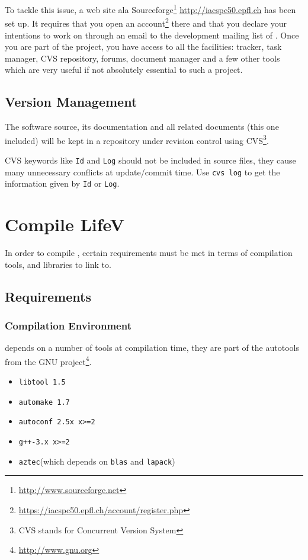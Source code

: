 To tackle this issue, a web site ala Sourceforge\footnote{\url{http://www.sourceforge.net}} \url{http://iacspc50.epfl.ch} has been set up. It requires that you open an account\footnote{\url{https://iacspc50.epfl.ch/account/register.php}} there and that you declare your intentions to work on \lifev through an email to the development mailing list of \lifev. Once you are part of the project, you have access to all the facilities: tracker, task manager, CVS repository, forums, document manager and a few other tools which are very useful if not absolutely essential to such a project.


\subsection{Version Management}
\label{sec:some-conventions}

The software source, its documentation and all related documents (this
one included) will be kept in a repository under revision control
using CVS\footnote{CVS
  stands for Concurrent Version System}.

CVS keywords like \verb!Id! and \verb!Log! should not be included in source files,
they cause many unnecessary conflicts at update/commit time. Use 
\verb!cvs log! to get the information given by \verb!Id! or \verb!Log!.

\section{Compile LifeV}
\label{compile-lifev} 

In order to compile \lifev, certain requirements must be met in terms
of compilation tools, and libraries to link to.

\subsection{Requirements}

\subsubsection{Compilation Environment}

\lifev depends on a number of tools at compilation time, they are part
of the autotools from the GNU
project\footnote{\url{http://www.gnu.org}}. 

\begin{itemize}
\item \verb!libtool 1.5!
\item \verb!automake 1.7!
\item \verb!autoconf 2.5x x>=2!
\item \verb!g++-3.x x>=2!
\item \verb!aztec!(which depends on \verb!blas! and \verb!lapack!)
\end{itemize} 

